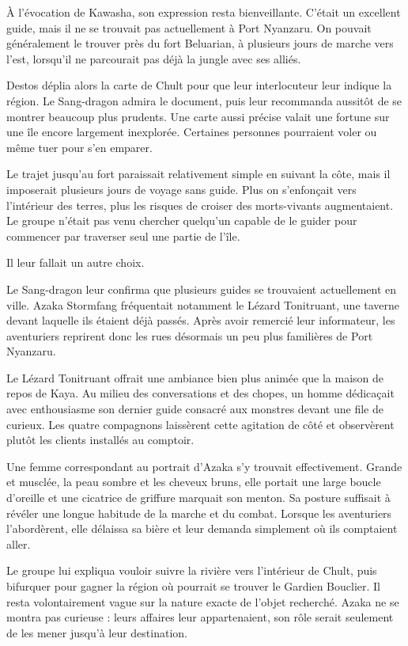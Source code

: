 À l'évocation de Kawasha, son expression resta bienveillante. C'était un excellent guide, mais il ne se trouvait pas actuellement à Port Nyanzaru. On pouvait généralement le trouver près du fort Beluarian, à plusieurs jours de marche vers l'est, lorsqu'il ne parcourait pas déjà la jungle avec ses alliés.

Destos déplia alors la carte de Chult pour que leur interlocuteur leur indique la région. Le Sang-dragon admira le document, puis leur recommanda aussitôt de se montrer beaucoup plus prudents. Une carte aussi précise valait une fortune sur une île encore largement inexplorée. Certaines personnes pourraient voler ou même tuer pour s'en emparer.

Le trajet jusqu'au fort paraissait relativement simple en suivant la côte, mais il imposerait plusieurs jours de voyage sans guide. Plus on s'enfonçait vers l'intérieur des terres, plus les risques de croiser des morts-vivants augmentaient. Le groupe n'était pas venu chercher quelqu'un capable de le guider pour commencer par traverser seul une partie de l'île.

Il leur fallait un autre choix.

Le Sang-dragon leur confirma que plusieurs guides se trouvaient actuellement en ville. Azaka Stormfang fréquentait notamment le Lézard Tonitruant, une taverne devant laquelle ils étaient déjà passés. Après avoir remercié leur informateur, les aventuriers reprirent donc les rues désormais un peu plus familières de Port Nyanzaru.

\scenebreak

Le Lézard Tonitruant offrait une ambiance bien plus animée que la maison de repos de Kaya. Au milieu des conversations et des chopes, un homme dédicaçait avec enthousiasme son dernier guide consacré aux monstres devant une file de curieux. Les quatre compagnons laissèrent cette agitation de côté et observèrent plutôt les clients installés au comptoir.

Une femme correspondant au portrait d'Azaka s'y trouvait effectivement. Grande et musclée, la peau sombre et les cheveux bruns, elle portait une large boucle d'oreille et une cicatrice de griffure marquait son menton. Sa posture suffisait à révéler une longue habitude de la marche et du combat. Lorsque les aventuriers l'abordèrent, elle délaissa sa bière et leur demanda simplement où ils comptaient aller.

Le groupe lui expliqua vouloir suivre la rivière vers l'intérieur de Chult, puis bifurquer pour gagner la région où pourrait se trouver le Gardien Bouclier. Il resta volontairement vague sur la nature exacte de l'objet recherché. Azaka ne se montra pas curieuse : leurs affaires leur appartenaient, son rôle serait seulement de les mener jusqu'à leur destination.

